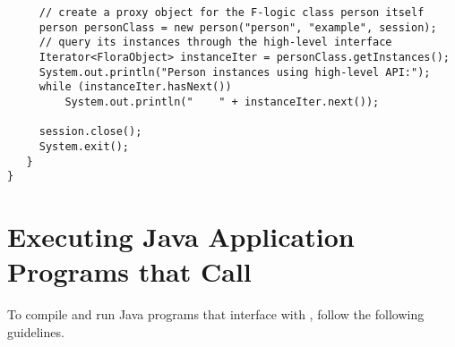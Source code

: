 \begin{verbatim}
     // create a proxy object for the F-logic class person itself
     person personClass = new person("person", "example", session);
     // query its instances through the high-level interface
     Iterator<FloraObject> instanceIter = personClass.getInstances();
     System.out.println("Person instances using high-level API:");
     while (instanceIter.hasNext())
         System.out.println("    " + instanceIter.next());
        
     session.close();
     System.exit();
   }
}
\end{verbatim}

\section{Executing Java Application Programs that Call \FLSYSTEM}
\label{sec-executing-apps}

To compile and run Java programs that interface with \FLSYSTEM, follow the
following guidelines.

